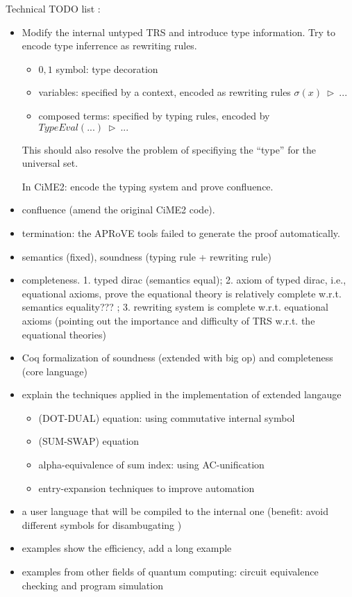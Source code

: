 \documentclass[manuscript, review, timestamp]{acmart}
\newcommand*{\reduce}{\ \triangleright\ }
\begin{document}
Technical TODO list :
\begin{itemize}
    \item Modify the internal untyped TRS and introduce type information. Try to encode type inferrence as rewriting rules.
        \begin{itemize}
            \item $0, 1$ symbol: type decoration
            \item variables: specified by a context, encoded as rewriting rules $\sigma(x) \reduce ...$
            \item composed terms: specified by typing rules, encoded by $TypeEval(...) \reduce ...$
        \end{itemize}
        This should also resolve the problem of specifiying the ``type'' for the universal set.

        In CiME2: encode the typing system and prove confluence. 
    \item confluence (amend the original CiME2 code).
    \item termination: the APRoVE tools failed to generate the proof automatically.
    \item semantics (fixed), soundness (typing rule + rewriting rule)
    \item completeness. 1. typed dirac (semantics equal); 2. axiom of typed dirac, i.e., equational axioms, prove the equational theory is relatively complete w.r.t. semantics equality??? ; 3. rewriting system is complete w.r.t. equational axioms (pointing out the importance and difficulty of TRS w.r.t. the equational theories)
    \item Coq formalization of soundness (extended with big op) and completeness (core language)
    \item explain the techniques applied in the implementation of extended langauge
        \begin{itemize}
            \item (DOT-DUAL) equation: using commutative internal symbol
            \item (SUM-SWAP) equation
            \item alpha-equivalence of sum index: using AC-unification
            \item entry-expansion techniques to improve automation
        \end{itemize}
    \item a user language that will be compiled to the internal one (benefit: avoid different symbols for disambugating )
    \item examples show the efficiency, add a long example
    \item examples from other fields of quantum computing: circuit equivalence checking and program simulation
\end{itemize}
\end{document}
